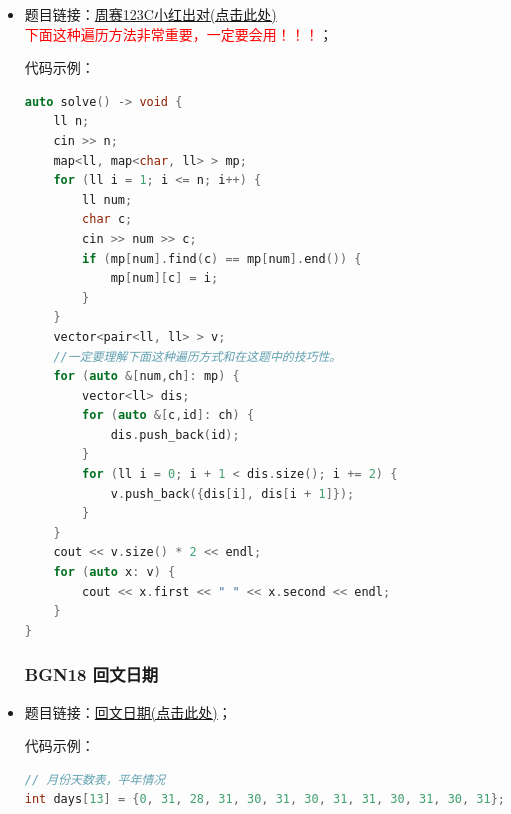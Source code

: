 \begin{itemize}
代码示例：\\
\begin{lstlisting}[language=C++]
#include <bits/stdc++.h>
using namespace std;

int main() {
	string s;
	cin >> s;
	int n = s.size();
	stack<char> st;
	int b = 1;
	for (int i = 0; i < n; i++) {
		if (s[i] == '(' || s[i] == '[') {
			st.push(s[i]);
		} else if (s[i] == ']') {
			if (st.empty() || st.top() != '[') {
				b = 0;
				break;
			}
			st.pop();
		} else if (s[i] == ')') {
			if (st.empty() || st.top() != '(') {
				b = 0;
				break;
			}
			st.pop();
		}
	}
	if (b)cout << "true" << endl;
	else cout << "false" << endl;
	return 0;
}
\end{lstlisting}
\subsubsection{map里面套map的用法}
\item 题目链接：\href{https://ac.nowcoder.com/acm/contest/125954/C}{周赛123C小红出对(点击此处)}\\\textcolor{red}{下面这种遍历方法非常重要，一定要会用！！！}；

代码示例：\\
\begin{lstlisting}[language=C++]
auto solve() -> void {
	ll n;
	cin >> n;
	map<ll, map<char, ll> > mp;
	for (ll i = 1; i <= n; i++) {
		ll num;
		char c;
		cin >> num >> c;
		if (mp[num].find(c) == mp[num].end()) {
			mp[num][c] = i;
		}
	}
	vector<pair<ll, ll> > v;
	//一定要理解下面这种遍历方式和在这题中的技巧性。
	for (auto &[num,ch]: mp) {
		vector<ll> dis;
		for (auto &[c,id]: ch) {
			dis.push_back(id);
		}
		for (ll i = 0; i + 1 < dis.size(); i += 2) {
			v.push_back({dis[i], dis[i + 1]});
		}
	}
	cout << v.size() * 2 << endl;
	for (auto x: v) {
		cout << x.first << " " << x.second << endl;
	}
}
\end{lstlisting}
\subsubsection{BGN18 回文日期}
\item 题目链接：\href{https://www.nowcoder.com/practice/0372242deac541d0b578cc6563395681?tpId=385&tags=&title=&difficulty=0&judgeStatus=0&rp=0&sourceUrl=%2Fexam%2Foj%3FquestionJobId%3D10%26subTabName%3Donline_coding_page}{回文日期(点击此处)}；

代码示例：\\
\begin{lstlisting}[language=C++]
// 月份天数表，平年情况
int days[13] = {0, 31, 28, 31, 30, 31, 30, 31, 31, 30, 31, 30, 31};


\end{lstlisting}
\end{itemize}
